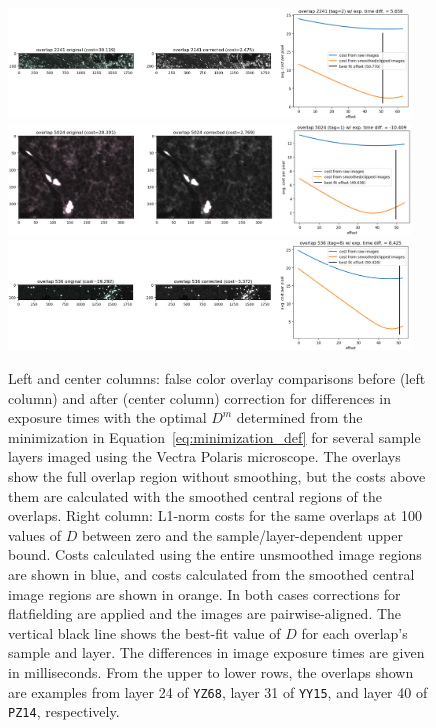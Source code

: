 \documentclass[letterpaper,11pt]{article}
\newcommand{\refeq}[1]{Equation~\ref{#1}}
\begin{document}
\begin{figure}[!ht]
\centering
\includegraphics[width=0.95\textwidth]{images/methods/cost_examples_polaris/overlay_comp_random_5023_offset=50.770}
\includegraphics[width=0.95\textwidth]{images/methods/cost_examples_polaris/overlay_comp_random_4697_offset=49.636}
\includegraphics[width=0.95\textwidth]{images/methods/cost_examples_polaris/overlay_comp_random_1916_offset=50.424}
\caption{\footnotesize Left and center columns: false color overlay comparisons before (left column) and after (center column) correction for differences in exposure times with the optimal $D^{m}$ determined from the minimization in \refeq{eq:minimization_def} for several sample layers imaged using the Vectra Polaris microscope. The overlays show the full overlap region without smoothing, but the costs above them are calculated with the smoothed central regions of the overlaps. Right column: L1-norm costs for the same overlaps at 100 values of $D$ between zero and the sample/layer-dependent upper bound. Costs calculated using the entire unsmoothed image regions are shown in blue, and costs calculated from the smoothed central image regions are shown in orange. In both cases corrections for flatfielding are applied and the images are pairwise-aligned. The vertical black line shows the best-fit value of $D$ for each overlap's sample and layer. The differences in image exposure times are given in milliseconds. From the upper to lower rows, the overlaps shown are examples from layer 24 of \texttt{YZ68}, layer 31 of \texttt{YY15}, and layer 40 of \texttt{PZ14}, respectively.}
\label{fig:overlap_cost_examples_polaris_2}
\end{figure}
\end{document}
